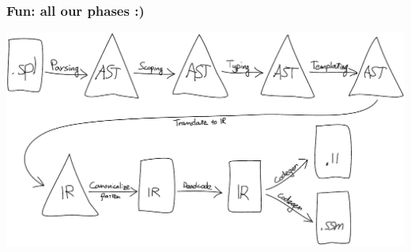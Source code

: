 \documentclass[14pt]{beamer}
\begin{document}
\begin{frame}
\begin{center}
	\frametitle{Fun: all our phases :)}
	\includegraphics[width=\textwidth]{phases}
\end{center}
\end{frame}
\end{document}
